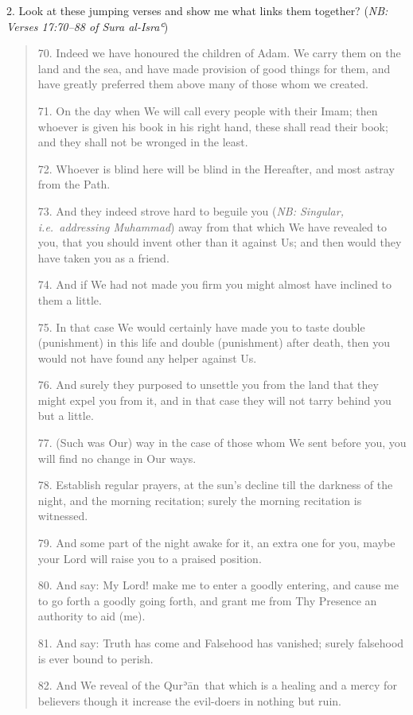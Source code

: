 \documentclass[12pt]{memoir}
\def\´{ʾ} %
\def\`{ʿ} %
\def \Quran{Qur\-\´ān} %
\def\–{-\hskip0pt}
\newcommand{\QRef}[1]{{\color{darkblue}#1}}
\newcommand{\NB}[1]{\emph{\small NB: #1}}
\begin{document}
2. Look at these jumping verses and show me what links them together?
(\NB{Verses \QRef{17:70–88} of Sura al\–Isra\`})

\begin{quote}
70. Indeed we have honoured the children of Adam.
We carry them on the land and the sea,
and have made provision of good things for them,
and have greatly preferred them above many of those whom we created.

71. On the day when We will call every people with their Imam;
then whoever is given his book in his right hand, these shall read their book;
and they shall not be wronged in the least.

72. Whoever is blind here will be blind in the Hereafter,
and most astray from the Path.

73. And they indeed strove hard to beguile you
(\NB{Singular, i.e.\ addressing Muhammad})
away from that which We have revealed to you,
that you should invent other than it against Us;
and then would they have taken you as a friend.

74. And if We had not made you firm
you might almost have inclined to them a little.

75. In that case We would certainly have made you to taste
double (punishment) in this life and double (punishment) after death,
then you would not have found any helper against Us.

76. And surely they purposed to unsettle you from the land
that they might expel you from it,
and in that case they will not tarry behind you but a little.

77. (Such was Our) way in the case of those whom We sent before you,
you will find no change in Our ways.

78. Establish regular prayers,
at the sun’s decline till the darkness of the night,
and the morning recitation; surely the morning recitation is witnessed.

79. And some part of the night awake for it, an extra one for you,
maybe your Lord will raise you to a praised position.

80. And say: My Lord! make me to enter a goodly entering,
and cause me to go forth a goodly going forth,
and grant me from Thy Presence an authority to aid (me).

81. And say: Truth has come and Falsehood has vanished;
surely falsehood is ever bound to perish.

82. And We reveal of the \Quran\ that which is a healing
and a mercy for believers though it increase the evil\–doers
in nothing but ruin.


\end{quote}
\end{document}
